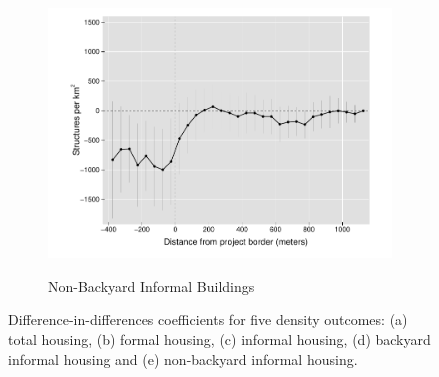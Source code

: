 \documentclass[12pt]{article}
\begin{document}
\begin{figure}[t!]
\begin{subfigure}[b]{0.49\textwidth}
            \label{fig:DDDbackyard}
        \end{subfigure}
        \vskip -1mm \vskip 0pt
        \begin{subfigure}[b]{.49\textwidth}  
            \centering
            \caption[]{Non-Backyard Informal Buildings} 
            \vspace{-2mm}
            \includegraphics[width=\textwidth,trim={1cm .8cm .3cm 0cm}, clip=true]{figures/distplotDDD_bblu_inf_non_backyard_admin}    
            \label{fig:DDDnonbackyard}
        \end{subfigure}
        \hfill \hspace{.02\textwidth}
        \begin{minipage}{0.47\textwidth}   
        \vspace{-6cm}
        \caption[]
        {\small Difference-in-differences coefficients for five density outcomes: (a) total housing, (b) formal housing, (c) informal housing, (d) backyard informal housing and (e) non-backyard informal housing.  } 
		\end{minipage}
        \label{fig:rawbblumeans}
    \end{figure} 
\end{document}
